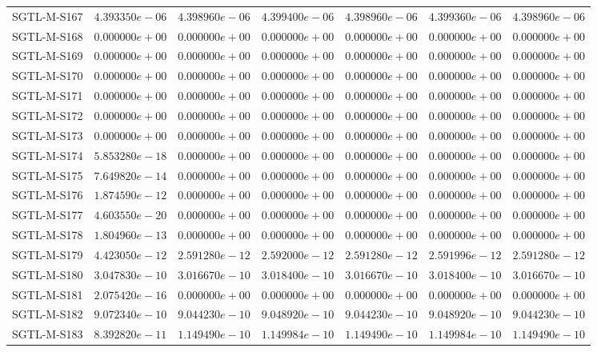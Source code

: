 \begin{longtable}{lrrrrrr}
SGTL-M-S167 & $4.393350e-06$ & $4.398960e-06$ & $4.399400e-06$ & $4.398960e-06$ & $4.399360e-06$ & $4.398960e-06$ \\
SGTL-M-S168 & $0.000000e+00$ & $0.000000e+00$ & $0.000000e+00$ & $0.000000e+00$ & $0.000000e+00$ & $0.000000e+00$ \\
SGTL-M-S169 & $0.000000e+00$ & $0.000000e+00$ & $0.000000e+00$ & $0.000000e+00$ & $0.000000e+00$ & $0.000000e+00$ \\
SGTL-M-S170 & $0.000000e+00$ & $0.000000e+00$ & $0.000000e+00$ & $0.000000e+00$ & $0.000000e+00$ & $0.000000e+00$ \\
SGTL-M-S171 & $0.000000e+00$ & $0.000000e+00$ & $0.000000e+00$ & $0.000000e+00$ & $0.000000e+00$ & $0.000000e+00$ \\
SGTL-M-S172 & $0.000000e+00$ & $0.000000e+00$ & $0.000000e+00$ & $0.000000e+00$ & $0.000000e+00$ & $0.000000e+00$ \\
SGTL-M-S173 & $0.000000e+00$ & $0.000000e+00$ & $0.000000e+00$ & $0.000000e+00$ & $0.000000e+00$ & $0.000000e+00$ \\
SGTL-M-S174 & $5.853280e-18$ & $0.000000e+00$ & $0.000000e+00$ & $0.000000e+00$ & $0.000000e+00$ & $0.000000e+00$ \\
SGTL-M-S175 & $7.649820e-14$ & $0.000000e+00$ & $0.000000e+00$ & $0.000000e+00$ & $0.000000e+00$ & $0.000000e+00$ \\
SGTL-M-S176 & $1.874590e-12$ & $0.000000e+00$ & $0.000000e+00$ & $0.000000e+00$ & $0.000000e+00$ & $0.000000e+00$ \\
SGTL-M-S177 & $4.603550e-20$ & $0.000000e+00$ & $0.000000e+00$ & $0.000000e+00$ & $0.000000e+00$ & $0.000000e+00$ \\
SGTL-M-S178 & $1.804960e-13$ & $0.000000e+00$ & $0.000000e+00$ & $0.000000e+00$ & $0.000000e+00$ & $0.000000e+00$ \\
SGTL-M-S179 & $4.423050e-12$ & $2.591280e-12$ & $2.592000e-12$ & $2.591280e-12$ & $2.591996e-12$ & $2.591280e-12$ \\
SGTL-M-S180 & $3.047830e-10$ & $3.016670e-10$ & $3.018400e-10$ & $3.016670e-10$ & $3.018400e-10$ & $3.016670e-10$ \\
SGTL-M-S181 & $2.075420e-16$ & $0.000000e+00$ & $0.000000e+00$ & $0.000000e+00$ & $0.000000e+00$ & $0.000000e+00$ \\
SGTL-M-S182 & $9.072340e-10$ & $9.044230e-10$ & $9.048920e-10$ & $9.044230e-10$ & $9.048920e-10$ & $9.044230e-10$ \\
SGTL-M-S183 & $8.392820e-11$ & $1.149490e-10$ & $1.149984e-10$ & $1.149490e-10$ & $1.149984e-10$ & $1.149490e-10$ \\

\end{longtable}
